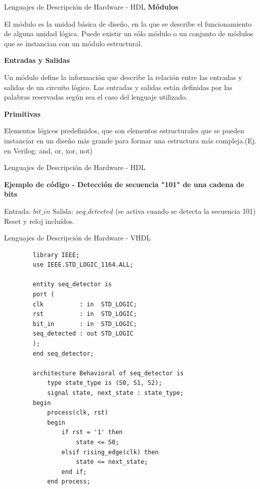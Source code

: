 \documentclass[11pt]{beamer}
\begin{document}
	\begin{frame}{Lenguajes de Descripción de Hardware - HDL}
		\textbf{Módulos} 
		
		El módulo es la unidad básica de diseño, en la que se describe el funcionamiento de alguna unidad lógica. Puede existir un sólo módulo o un conjunto de módulos que se instancian con un módulo estructural.\newline
		
		
		\textbf{Entradas y Salidas} 
		
		Un módulo define la información que describe la relación entre las entradas y salidas de un circuito lógico. Las entradas y salidas están definidas por las palabras reservadas según sea el caso del lenguaje utilizado.\newline
		
		\textbf{Primitivas} 
		
		Elementos lógicos predefinidos, que son elementos estructurales que se pueden instanciar en un diseño más grande para formar una estructura más compleja.(Ej. en Verilog: and, or, xor, not)
		
		
		
	\end{frame}
	
	\begin{frame}{Lenguajes de Descripción de Hardware - HDL}
		
		\textbf{Ejemplo de código - Detección de secuencia "101" de una cadena de bits} \newline
		
	Entrada: $bit\_in$ \newline
	Salida: $seq\_detected$ (se activa cuando se detecta la secuencia 101) \newline
	Reset y reloj incluídos.
		
	\end{frame}
	
	
	\begin{frame}[fragile]{Lenguajes de Descripción de Hardware - VHDL}
		\begin{lstlisting}
		library IEEE;
		use IEEE.STD_LOGIC_1164.ALL;
		
		entity seq_detector is
		port (
		clk          : in  STD_LOGIC;
		rst          : in  STD_LOGIC;
		bit_in       : in  STD_LOGIC;
		seq_detected : out STD_LOGIC
		);
		end seq_detector;
		
		architecture Behavioral of seq_detector is
			type state_type is (S0, S1, S2);
			signal state, next_state : state_type;
		begin
			process(clk, rst)
			begin
				if rst = '1' then
					state <= S0;
				elsif rising_edge(clk) then
					state <= next_state;
				end if;
			end process;
		\end{lstlisting}
	\end{frame}
	
\end{document}
